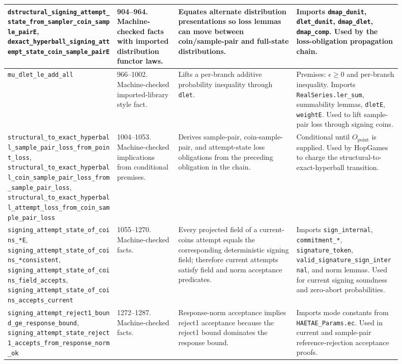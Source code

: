 \documentclass[11pt]{report}
\DeclareRobustCommand{\file}[1]{\ifmmode\text{\nolinkurl{#1}}\else\nolinkurl{#1}\fi}
\DeclareRobustCommand{\ec}[1]{\ifmmode\text{\nolinkurl{#1}}\else\nolinkurl{#1}\fi}
\theoremstyle{definition}
\theoremstyle{plain}
\begin{document}
{\begin{longtable}{p{0.25\linewidth}p{0.14\linewidth}p{0.27\linewidth}p{0.24\linewidth}}
\ec{dstructural\_signing\_attempt\_state\_from\_sampler\_coin\_sample\_pairE},
\ec{dexact\_hyperball\_signing\_attempt\_state\_coin\_sample\_pairE} &
904--964. Machine-checked facts with imported distribution functor laws. &
Equates alternate distribution presentations so loss lemmas can move between
coin/sample-pair and full-state distributions. &
Imports \ec{dmap\_dunit}, \ec{dlet\_dunit}, \ec{dmap\_dlet}, \ec{dmap\_comp}.
Used by the loss-obligation propagation chain. \\
\midrule
\ec{mu\_dlet\_le\_add\_all} &
966--1002. Machine-checked imported-library style fact. &
Lifts a per-branch additive probability inequality through \ec{dlet}. &
Premises: \(\epsilon\ge 0\) and per-branch inequality.  Imports
\ec{RealSeries.ler\_sum}, summability lemmas, \ec{dletE}, \ec{weightE}.  Used
to lift sample-pair loss through signing coins. \\
\midrule
\ec{structural\_to\_exact\_hyperball\_sample\_pair\_loss\_from\_point\_loss},
\ec{structural\_to\_exact\_hyperball\_coin\_sample\_pair\_loss\_from\_sample\_pair\_loss},
\ec{structural\_to\_exact\_hyperball\_attempt\_loss\_from\_coin\_sample\_pair\_loss} &
1004--1053. Machine-checked implications from conditional premises. &
Derives sample-pair, coin-sample-pair, and attempt-state loss obligations from
the preceding obligation in the chain. &
Conditional until \(O_{\mathrm{point}}\) is supplied.  Used by HopGames to
charge the structural-to-exact-hyperball transition. \\
\midrule
\ec{signing\_attempt\_state\_of\_coins\_*E},
\ec{signing\_attempt\_state\_of\_coins\_*consistent},
\ec{signing\_attempt\_state\_of\_coins\_field\_accepts},
\ec{signing\_attempt\_state\_of\_coins\_accepts\_current} &
1055--1270. Machine-checked facts. &
Every projected field of a current-coins attempt equals the corresponding
deterministic signing field; therefore current attempts satisfy field and norm
acceptance predicates. &
Imports \ec{sign\_internal}, \ec{commitment\_*}, \ec{signature\_token},
\ec{valid\_signature\_sign\_internal}, and norm lemmas.  Used for current
signing soundness and zero-abort probabilities. \\
\midrule
\ec{signing\_attempt\_reject1\_bound\_ge\_response\_bound},
\ec{signing\_attempt\_state\_reject1\_accepts\_from\_response\_norm\_ok} &
1272--1287. Machine-checked facts. &
Response-norm acceptance implies reject1 acceptance because the reject1 bound
dominates the response bound. &
Imports mode constants from \file{HAETAE\_Params.ec}.  Used in current and
sample-pair reference-rejection acceptance proofs. \\

\end{longtable}}
\end{document}

